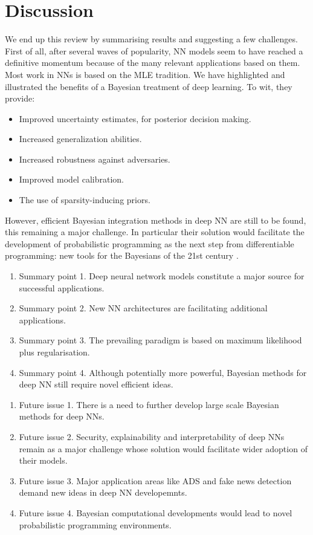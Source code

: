 \section{Discussion}
We end up this review by summarising results and suggesting a few challenges.
First of all, after several waves of popularity, NN models seem to 
have reached a definitive momentum because of the many relevant applications
based on them. Most work in NNs is based on the MLE tradition.
We have highlighted and illustrated the benefits of a Bayesian treatment of deep learning. To wit, they provide:
\begin{itemize}
    \item Improved uncertainty estimates, for posterior decision making.
    \item Increased generalization abilities.
    \item Increased robustness against adversaries.
    \item Improved model calibration.
    \item The use of sparsity-inducing priors.
\end{itemize}
However, efficient Bayesian integration methods in 
deep NN are 
still to be found, this remaining a major challenge.
In particular their solution would facilitate the
development of probabilistic programming 
as the next step from differentiable programming: new tools for the Bayesians of the 21st century \citep{gordon2014probabilistic,carpenter2017stan,wood2014new}.

\begin{summary}
\begin{enumerate}
\item Summary point 1. Deep neural network models constitute
a major source for successful applications. 
\item Summary point 2. New NN architectures are facilitating
additional applications. 
\item Summary point 3. The prevailing paradigm is based on 
maximum likelihood plus regularisation.
\item Summary point 4. Although potentially more powerful,
Bayesian methods for deep NN still require novel efficient ideas.
\end{enumerate}
\end{summary}

\begin{issues}
\begin{enumerate}
\item Future issue 1. There is a need to further develop 
large scale Bayesian methods for deep NNs.
\item Future issue 2. Security, explainability and 
interpretability of deep NNs remain as a major challenge
whose solution would facilitate wider adoption of
their models. 
\item Future issue 3. Major application areas like ADS and fake news detection demand new ideas in deep NN 
developemnts. 
\item Future issue 4. Bayesian computational developments
would lead to novel probabilistic programming environments.
\end{enumerate}
\end{issues}